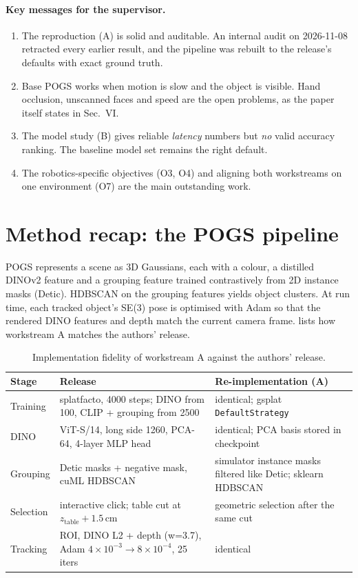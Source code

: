 \documentclass[10pt,a4paper]{article}
\begin{document}
\paragraph{Key messages for the supervisor.}
\begin{enumerate}
\item The reproduction (A) is solid and auditable. An internal audit on 2026-11-08 retracted
      every earlier result, and the pipeline was rebuilt to the release's defaults with exact ground truth.
\item Base POGS works when motion is slow and the object is visible. Hand occlusion, unscanned
      faces and speed are the open problems, as the paper itself states in Sec.~VI.
\item The model study (B) gives reliable \emph{latency} numbers but \emph{no} valid accuracy
      ranking. The baseline model set remains the right default.
\item The robotics-specific objectives (O3, O4) and aligning both workstreams on one environment (O7) are the main
      outstanding work.
\end{enumerate}

\section{Method recap: the POGS pipeline}
POGS represents a scene as 3D Gaussians, each with a colour, a distilled DINOv2 feature and a
grouping feature trained contrastively from 2D instance masks (Detic). HDBSCAN on the grouping
features yields object clusters. At run time, each tracked object's SE(3) pose is optimised with
Adam so that the rendered DINO features and depth match the current camera frame.
 lists how workstream A matches the authors' release.

\begin{table}[H]
\centering\small
\caption{Implementation fidelity of workstream A against the authors' release.}
\label{tab:pipeline}
\begin{tabularx}{\linewidth}{@{}l L L@{}}
\toprule
Stage & Release & Re-implementation (A) \\
\midrule
Training & splatfacto, 4000 steps; DINO from 100, CLIP + grouping from 2500 & identical; gsplat \texttt{DefaultStrategy} \\
DINO & ViT-S/14, long side 1260, PCA-64, 4-layer MLP head & identical; PCA basis stored in checkpoint \\
Grouping & Detic masks + negative mask, cuML HDBSCAN & simulator instance masks filtered like Detic; sklearn HDBSCAN \\
Selection & interactive click; table cut at $z_\text{table}+1.5$\,cm & geometric selection after the same cut \\
Tracking & ROI, DINO L2 + depth (w=3.7), Adam $4\!\times\!10^{-3}\!\to\!8\!\times\!10^{-4}$, 25 iters & identical \\
\bottomrule
\end{tabularx}
\end{table}
\end{document}
